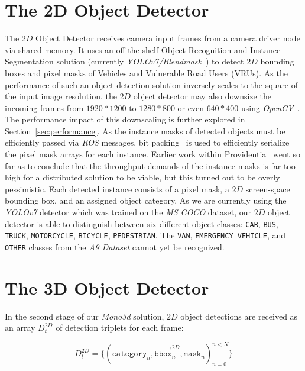 
\section{The 2D Object Detector}
\label{sec:segmentation}

The $2D$ Object Detector receives camera input frames from a camera driver node via shared memory.
It uses an off-the-shelf Object Recognition and Instance Segmentation solution (currently \textit{YOLOv7/Blendmask}~\cite{wang2022yolov7, chen2020blendmask}) to detect $2D$ bounding boxes and pixel masks of Vehicles and Vulnerable Road Users (VRUs).
As the performance of such an object detection solution inversely scales to the square of the input image resolution, the $2D$ object detector may also downsize the incoming frames from $1920*1200$ to $1280*800$ or even $640*400$ using \textit{OpenCV}~\cite{opencv_library}.
The performance impact of this downscaling is further explored in Section~\ref{sec:performance}.
As the instance masks of detected objects must be efficiently passed via \textit{ROS} messages, bit packing~\cite{5219512} is used to efficiently serialize the pixel mask arrays for each instance.
Earlier work within Providentia~\cite{leonthesis} went so far as to conclude that the throughput demands of the instance masks is far too high for a distributed solution to be viable, but this turned out to be overly pessimistic.
Each detected instance consists of a pixel mask, a $2D$ screen-space bounding box, and an assigned object category.
As we are currently using the \textit{YOLOv7} detector which was trained on the \textit{MS COCO} dataset, our $2D$ object detector is able to distinguish between six different object classes: \texttt{CAR}, \texttt{BUS}, \texttt{TRUCK}, \texttt{MOTORCYCLE}, \texttt{BICYCLE}, \texttt{PEDESTRIAN}.
The \texttt{VAN}, \texttt{EMERGENCY\_VEHICLE}, and \texttt{OTHER} classes from the \textit{A9 Dataset} cannot yet be recognized.

\section{The 3D Object Detector}
\label{sec:mono3doverview}

In the second stage of our \textit{Mono3d} solution, $2D$ object detections are received as an array $D^{2D}_t$ of detection triplets for each frame:

\[
    D^{2D}_t = \{ (\mathtt{category}_n, \overrightarrow{\mathtt{bbox}}^{2D}_n, \mathtt{mask}_n)^{n < N}_{n=0}\}
\]

